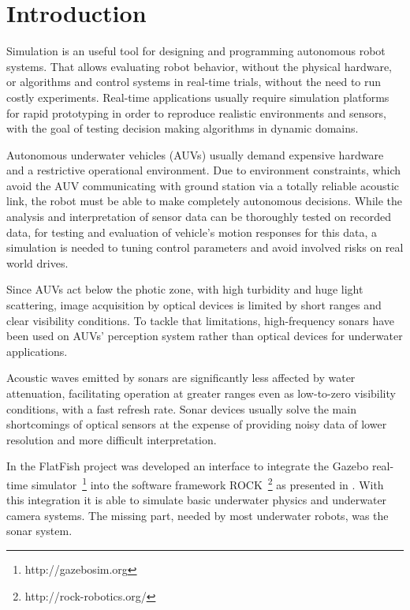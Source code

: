 \documentclass[final,5p,times]{elsarticle}
\begin{document}
\linenumbers

\section{Introduction}
\label{introduction}

Simulation is an useful tool for designing and programming autonomous robot systems. That allows evaluating robot behavior, without the physical hardware, or algorithms and control systems in real-time trials, without the need to run costly experiments. Real-time applications usually require simulation platforms for rapid prototyping in order to reproduce realistic environments and sensors, with the goal of testing decision making algorithms in dynamic domains.

Autonomous underwater vehicles (AUVs) usually demand expensive hardware and a restrictive operational environment. Due to environment constraints, which avoid the AUV communicating with ground station via a totally reliable acoustic link, the robot must be able to make completely autonomous decisions. While the analysis and interpretation of sensor data can be thoroughly tested on recorded data, for testing and evaluation of vehicle's motion responses for this data, a simulation is needed to tuning control parameters and avoid involved risks on real world drives.

Since AUVs act below the photic zone, with high turbidity and huge light scattering, image acquisition by optical devices is limited by short ranges and clear visibility conditions. To tackle that limitations, high-frequency sonars have been used on AUVs' perception system rather than optical devices for underwater applications.

Acoustic waves emitted by sonars are significantly less affected by water attenuation, facilitating operation at greater ranges even as low-to-zero visibility conditions, with a fast refresh rate. Sonar devices usually solve the main shortcomings of optical sensors at the expense of providing noisy data of lower resolution and more difficult interpretation.

In the FlatFish project \cite{albiez2015} was developed an interface to integrate the Gazebo real-time simulator~\footnote{http://gazebosim.org} into the software framework ROCK~\footnote{http://rock-robotics.org/} as presented in \cite{watanabe2015}. With this integration it is able to simulate basic underwater physics and underwater camera systems. The missing part, needed by most underwater robots, was the sonar system.
\end{document}
